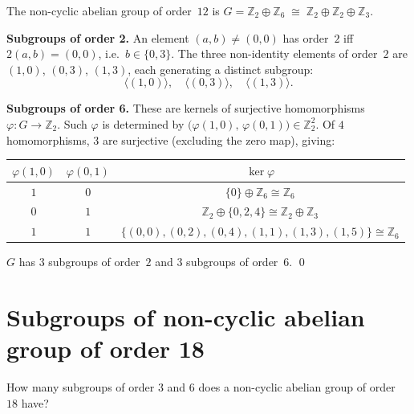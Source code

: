 \documentclass[12pt,a4paper]{article}
\newenvironment{problem}{\begin{mdframed}[style=problemstyle]}{\end{mdframed}}
\newenvironment{sol}{\begin{mdframed}[style=solstyle]}{\end{mdframed}}
\newcommand{\Z}{\mathbb{Z}}
\newcommand{\gen}[1]{\langle #1 \rangle}
\begin{document}
\begin{sol}
The non-cyclic abelian group of order~$12$ is
$G = \Z_2 \oplus \Z_6 \;\cong\; \Z_2 \oplus \Z_2 \oplus \Z_3$.

\medskip
\textbf{\color{SectCol}Subgroups of order 2.}\;
An element $(a,b) \neq (0,0)$ has order~$2$ iff $2(a,b)=(0,0)$, i.e.\
$b \in \{0,3\}$. The three non-identity elements of order~$2$ are
$(1,0)$, $(0,3)$, $(1,3)$, each generating a distinct subgroup:
\[
  \gen{(1,0)},\quad \gen{(0,3)},\quad \gen{(1,3)}.
\]

\medskip
\textbf{\color{SectCol}Subgroups of order 6.}\;
These are kernels of surjective homomorphisms $\varphi\colon G \to \Z_2$.
Such $\varphi$ is determined by $\bigl(\varphi(1,0),\, \varphi(0,1)\bigr) \in \Z_2^2$.
Of $4$ homomorphisms, $3$ are surjective (excluding the zero map), giving:

\smallskip
\begin{center}
\renewcommand{\arraystretch}{1.2}
\begin{tabular}{ccc}
  \toprule
  $\varphi(1,0)$ & $\varphi(0,1)$ & $\ker\varphi$ \\
  \midrule
  $1$ & $0$ & $\{0\}\oplus\Z_6 \cong \Z_6$ \\
  $0$ & $1$ & $\Z_2\oplus\{0,2,4\} \cong \Z_2\oplus\Z_3$ \\
  $1$ & $1$ & $\{(0,0),(0,2),(0,4),(1,1),(1,3),(1,5)\} \cong \Z_6$ \\
  \bottomrule
\end{tabular}
\end{center}

\medskip
$G$ has $\boxed{3}$ subgroups of order~$2$ and $\boxed{3}$ subgroups of order~$6$. \qed
\end{sol}

\bigskip
\section{Subgroups of non-cyclic abelian group of order 18}

\begin{problem}
How many subgroups of order $3$ and $6$ does a non-cyclic abelian group of order~$18$ have?
\end{problem}
\end{document}
